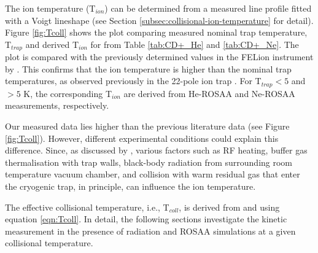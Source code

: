 The ion temperature (T$_{ion}$) can be determined from a measured line profile
fitted with a Voigt lineshape (see Section
\ref{subsec:collisional-ion-temperature} for detail). Figure \ref{fig:Tcoll}
shows the plot comparing measured nominal trap temperature, T$_{trap}$ and
derived T$_{ion}$ for \CD from Table \ref{tab:CD+_He} and \ref{tab:CD+_Ne}.
The plot is compared with the previously determined values in the FELion
instrument by \citet{kluge_state-selective_2016}. This confirms that the ion
temperature is higher than the nominal trap temperatures, as observed
previously in the 22-pole ion trap \cite{asvany_numerical_2009,
    otto_internal_2013, endres_incomplete_2017}. For T$_{trap} < 5$ and $>5$ K, the
corresponding T$_{ion}$ are derived from He-ROSAA and Ne-ROSAA measurements,
respectively.


Our measured \Tion data lies higher than the previous literature data (see Figure \ref{fig:Tcoll}). However, different experimental conditions could explain this difference. Since, as discussed by \citet{endres_incomplete_2017}, various factors such as RF heating, buffer gas thermalisation with trap walls, black-body radiation from surrounding room temperature vacuum chamber, and collision with warm residual gas that enter the cryogenic trap, in principle, can influence the ion temperature.



The effective collisional temperature, i.e., T$_{coll}$, is derived from \Ttrap
and \Tion using equation \ref{eqn:Tcoll}. In detail, the following sections
investigate the kinetic measurement in the presence of radiation and ROSAA
simulations at a given collisional temperature.

